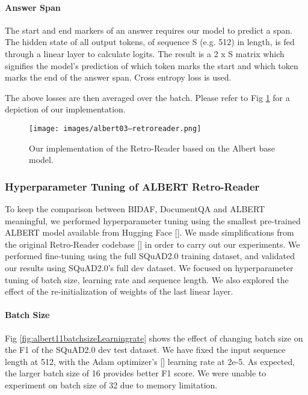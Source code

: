 \documentclass{article}
\begin{document}
\paragraph{Answer Span}
The start and end markers of an answer requires our model to predict a span.  The hidden state of all output tokens, of sequence S (e.g. 512) in length, is fed through a linear layer to calculate logits.  The result is a 2 x S matrix which signifies the model’s prediction of which token marks the start and which token marks the end of the answer span.  Cross entropy loss is used.

The above losses are then averaged over the batch.  Please refer to Fig \ref{fig:albert03RetroReader} for a depiction of our implementation.

\begin{figure}[h]
  \texttt{[image: images/albert03--retroreader.png]}
  \centering
  \caption{Our implementation of the Retro-Reader based on the Albert base model.}
  \label{fig:albert03RetroReader}
\end{figure}



\subsubsection{Hyperparameter Tuning of ALBERT Retro-Reader}

To keep the comparison between BIDAF, DocumentQA and ALBERT meaningful, we performed hyperparameter tuning using the smallest pre-trained ALBERT model available from Hugging Face [].  We made simplifications from the original Retro-Reader codebase [] in order to carry out our experiments.  We performed fine-tuning using the full SQuAD2.0 training dataset, and validated our results using SQuAD2.0’s full dev dataset.  We focused on hyperparameter tuning of batch size, learning rate and sequence length.  We also explored the effect of the re-initialization of weights of the last linear layer.

\paragraph{Batch Size}

Fig \ref{fig:albert11batchsizeLearningrate} shows the effect of changing batch size on the F1 of the SQuAD2.0 dev test dataset.  We have fixed the input sequence length at 512, with the Adam optimizer’s [] learning rate at 2e-5.  As expected, the larger batch size of 16 provides better F1 score.  We were unable to experiment on batch size of 32 due to memory limitation.
\end{document}
